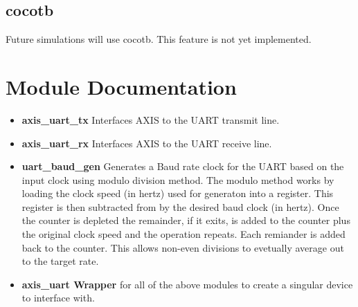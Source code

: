 \subsection{cocotb}
\par
Future simulations will use cocotb. This feature is not yet implemented.

\newpage

\section{Module Documentation} \label{Module Documentation}

\begin{itemize}
\item \textbf{axis\_uart\_tx} Interfaces AXIS to the UART transmit line.\\
\item \textbf{axis\_uart\_rx} Interfaces AXIS to the UART receive line.\\
\item \textbf{uart\_baud\_gen} Generates a Baud rate clock for the UART based on the input clock using modulo division method.
The modulo method works by loading the clock speed (in hertz) used for generaton into a register. This register is then
subtracted from by the desired baud clock (in hertz). Once the counter is depleted the remainder, if it exits, is added
to the counter plus the original clock speed and the operation repeats. Each remiander is added back to the counter. This
allows non-even divisions to evetually average out to the target rate.\\
\item \textbf{axis\_uart Wrapper} for all of the above modules to create a singular device to interface with.\\
\end{itemize}


